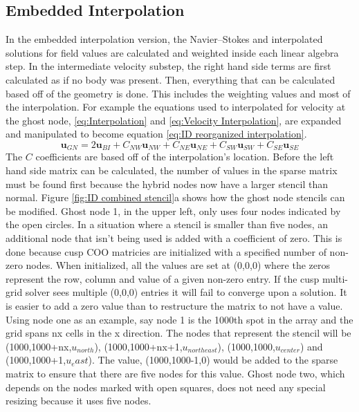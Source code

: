 \documentclass[onehalf,11pt]{beavtex}
\begin{document}
\subsection{Embedded Interpolation}
In the embedded interpolation version, the Navier--Stokes and interpolated solutions for field values are calculated and weighted inside each linear algebra step.
In the intermediate velocity substep, the right hand side terms are first calculated as if no body was present.
Then, everything that can be calculated based off of the geometry is done.
This includes the weighting values and most of the interpolation.
For example the equations used to interpolated for velocity at the ghost node, \eqref{eq:Interpolation} and \eqref{eq:Velocity Interpolation}, are expanded and manipulated to become equation \eqref{eq:ID reorganized interpolation}.
\begin{equation}
\textbf{u}_{GN} = 2\textbf{u}_{BI} + C_{NW}\textbf{u}_{NW} + C_{NE}\textbf{u}_{NE} + C_{SW}\textbf{u}_{SW} + C_{SE}\textbf{u}_{SE}\label{eq:ID reorganized interpolation}
\end{equation}
The $C$ coefficients are based off of the interpolation's location.
Before the left hand side matrix can be calculated, the number of values in the sparse matrix must be found first because the hybrid nodes now have a larger stencil than normal. 
Figure \ref{fig:ID combined stencil}a shows how the ghost node stencils can be modified.
Ghost node 1, in the upper left, only uses four nodes indicated by the open circles. 
In a situation where a stencil is smaller than five nodes, an additional node that isn't being used is added with a coefficient of zero.
This is done because cusp COO matricies are initialized with a specified number of non-zero nodes.
When initialized, all the values are set at (0,0,0) where the zeros represent the row, column and value of a given non-zero entry.
If the cusp multi-grid solver sees multiple (0,0,0) entries it will fail to converge upon a solution.
It is easier to add a zero value than to restructure the matrix to not have a value.
Using node one as an example, say node 1 is the 1000th spot in the array and the grid spans nx cells in the x direction.
The nodes that represent the stencil will be (1000,1000+nx,$u_{north}$), (1000,1000+nx+1,$u_{north east}$), (1000,1000,$u_{center}$) and (1000,1000+1,$u_east$).
The value, (1000,1000-1,0) would be added to the sparse matrix to ensure that there are five nodes for this value.
Ghost node two, which depends on the nodes marked with open squares, does not need any special resizing because it uses five nodes.
\end{document}
